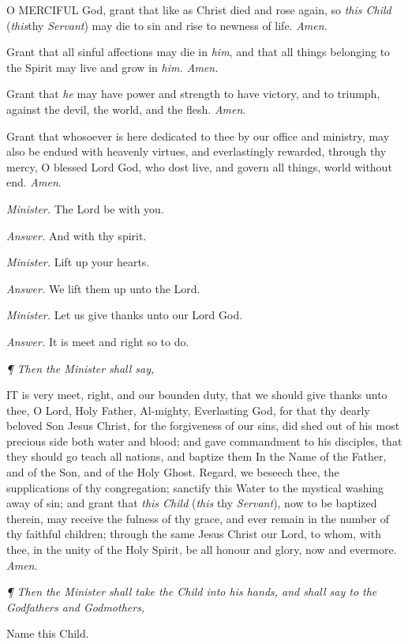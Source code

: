 O
MERCIFUL God, grant that like as Christ died and rose again, so \emph{this
Child} (\emph{this}thy \emph{Servant}) may die to sin and rise
to newness of life. \emph{Amen}.

Grant that all sinful affections may die in \emph{him}, and that all
things belonging to the Spirit may live and grow in \emph{him. Amen.}

Grant that \emph{he} may have power and strength
to have victory, and to triumph, against the devil, the world, and the
flesh. \emph{Amen}.

Grant that whosoever is here dedicated to thee by our
office and ministry, may also be endued with heavenly virtues, and everlastingly
rewarded, through thy mercy, O blessed Lord God, who dost live, and govern
all things, world without end. \emph{Amen}.

\emph{Minister.} The
Lord be with you.

\emph{Answer.} And with thy spirit.

\emph{Minister.} Lift up your hearts.

\emph{Answer.} We
lift them up unto the Lord.

\emph{Minister.} Let
us give thanks unto our Lord God.

\emph{Answer.} It
is meet and right so to do.

\emph{¶
Then the Minister shall say,}

IT
is very meet, right, and our bounden duty, that we should give thanks
unto thee, O Lord, Holy Father, Al-mighty, Everlasting God, for that
thy dearly beloved Son Jesus Christ, for the forgiveness of our sins,
did shed out of his most precious side both water and blood; and gave
commandment to his disciples, that they should go teach all nations,
and baptize them In the Name of the Father, and of the Son, and of the
Holy Ghost. Regard, we beseech thee, the supplications of thy congregation;
sanctify this Water to the mystical washing away of sin; and grant that
\emph{this Child} (\emph{this} thy \emph{Servant}), now to be
baptized therein, may receive the fulness of thy grace, and ever remain
in the number of thy faithful children; through the same Jesus Christ
our Lord, to whom, with thee, in the unity of the Holy Spirit, be all
honour and glory, now and evermore. \emph{Amen}.

\emph{¶
Then the Minister shall take the Child into his hands, and shall say to
the Godfathers and Godmothers,}

Name this
Child.

